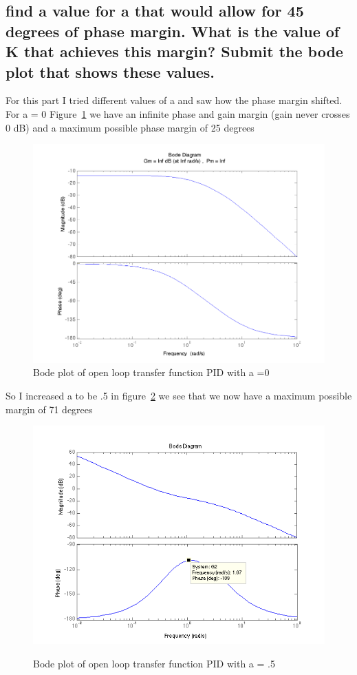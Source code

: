 \documentclass[english]{article}
\begin{document}
\subsection*{find a value for a that would allow for 45 degrees of phase margin. What is the value of K that achieves this margin? Submit the bode plot that shows these values.}
For this part I tried different values of a  and saw how the phase margin shifted. For a = 0 Figure~\ref{fig:3_e1}  we have an infinite phase and gain margin (gain never crosses 0 dB) and a maximum possible phase margin of 25 degrees
\begin{figure}[h!]
\caption {Bode plot of open loop transfer function PID with a =0} 
\label{fig:3_e1}
\includegraphics[width =\linewidth]{3e_a0.png}
\end{figure} 
\FloatBarrier
So I increased a to be .5 in figure~\ref{fig:3_e2} we see that we now have a maximum possible margin of 71 degrees 
\begin{figure}[h!]
\caption{Bode plot of open loop transfer function PID with a = .5} 
\includegraphics[width = \linewidth]{3e_ahalf2.png}
\label{fig:3_e2}
\end{figure}
\end{document}
